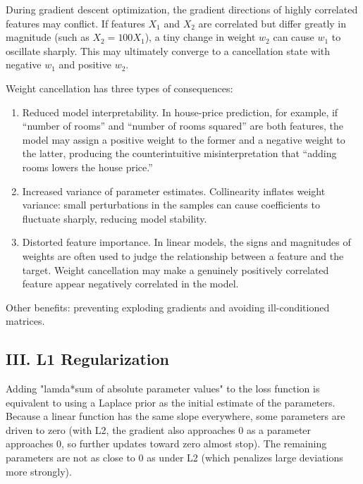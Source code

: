 During gradient descent optimization, the gradient directions of highly correlated features may conflict. If features \(X_1\) and \(X_2\) are correlated but differ greatly in magnitude (such as \(X_2=100X_1\)), a tiny change in weight \(w_2\) can cause \(w_1\) to oscillate sharply. This may ultimately converge to a cancellation state with negative \(w_1\) and positive \(w_2\).

Weight cancellation has three types of consequences:

\begin{enumerate}
\def\labelenumi{\arabic{enumi}.}
\item
  Reduced model interpretability. In house-price prediction, for example, if ``number of rooms'' and ``number of rooms squared'' are both features, the model may assign a positive weight to the former and a negative weight to the latter, producing the counterintuitive misinterpretation that ``adding rooms lowers the house price.''
\item
  Increased variance of parameter estimates. Collinearity inflates weight variance: small perturbations in the samples can cause coefficients to fluctuate sharply, reducing model stability.
\item
  Distorted feature importance. In linear models, the signs and magnitudes of weights are often used to judge the relationship between a feature and the target. Weight cancellation may make a genuinely positively correlated feature appear negatively correlated in the model.
\end{enumerate}

Other benefits: preventing exploding gradients and avoiding ill-conditioned matrices.

\hypertarget{iii.-l1-regularization}{%
\subsection{III. L1 Regularization}\label{iii.-l1-regularization}}

Adding "lamda*sum of absolute parameter values" to the loss function is equivalent to using a Laplace prior as the initial estimate of the parameters. Because a linear function has the same slope everywhere, some parameters are driven to zero (with L2, the gradient also approaches 0 as a parameter approaches 0, so further updates toward zero almost stop). The remaining parameters are not as close to 0 as under L2 (which penalizes large deviations more strongly).

